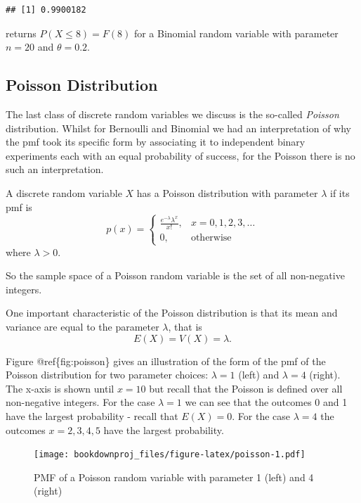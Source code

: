 \documentclass[
]{book}
\theoremstyle{definition}
\theoremstyle{definition}
\theoremstyle{definition}
\theoremstyle{definition}
\theoremstyle{remark}
\begin{document}
\begin{verbatim}
## [1] 0.9900182
\end{verbatim}

returns \(P(X\leq 8) = F(8)\) for a Binomial random variable with parameter \(n=20\) and \(\theta = 0.2\).

\hypertarget{poisson-distribution}{%
\subsection{Poisson Distribution}\label{poisson-distribution}}

The last class of discrete random variables we discuss is the so-called \emph{Poisson} distribution. Whilst for Bernoulli and Binomial we had an interpretation of why the pmf took its specific form by associating it to independent binary experiments each with an equal probability of success, for the Poisson there is no such an interpretation.

A discrete random variable \(X\) has a Poisson distribution with parameter \(\lambda\) if its pmf is
\[
p(x)=\left\{
\begin{array}{ll}
\frac{e^{-\lambda}\lambda^x}{x!}, & x = 0,1,2,3,\dots\\
0, & \mbox{otherwise}
\end{array}
\right.
\]
where \(\lambda > 0\).

So the sample space of a Poisson random variable is the set of all non-negative integers.

One important characteristic of the Poisson distribution is that its mean and variance are equal to the parameter \(\lambda\), that is
\[
E(X)= V(X) = \lambda.
\]

Figure @ref\{fig:poisson\} gives an illustration of the form of the pmf of the Poisson distribution for two parameter choices: \(\lambda=1\) (left) and \(\lambda = 4\) (right). The x-axis is shown until \(x=10\) but recall that the Poisson is defined over all non-negative integers. For the case \(\lambda=1\) we can see that the outcomes 0 and 1 have the largest probability - recall that \(E(X)=0\). For the case \(\lambda = 4\) the outcomes \(x = 2,3,4,5\) have the largest probability.

\begin{figure}
\centering
\texttt{[image: bookdownproj\_files/figure-latex/poisson-1.pdf]}
\caption{\label{fig:poisson}PMF of a Poisson random variable with parameter 1 (left) and 4 (right)}
\end{figure}
\end{document}
